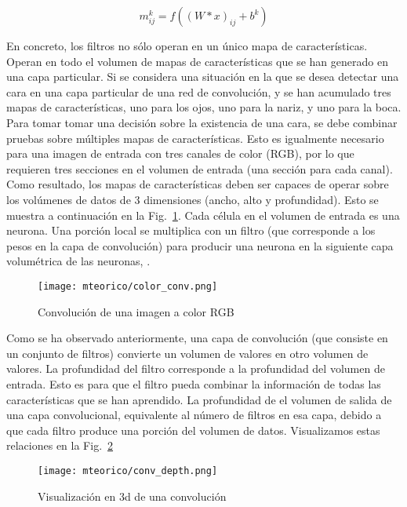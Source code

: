     \begin{equation}
		m^k_{ij}=f((W*x)_{ij}+b^k)
	\end{equation}
	
	En concreto, los filtros no sólo operan en un único mapa de características. Operan en todo el volumen de mapas de características que se han generado en una capa particular. Si se considera una situación en la que se desea detectar una cara en una capa particular de una red de convolución, y se han acumulado tres mapas de características, uno para los ojos, uno para la nariz, y uno para la boca. Para tomar tomar una decisión sobre la existencia de una cara, se debe combinar pruebas sobre múltiples mapas de características. Esto es igualmente necesario para una imagen de entrada con tres canales de color (RGB), por lo que requieren tres secciones en el volumen de entrada (una sección para cada canal). Como resultado, los mapas de características deben ser capaces de operar sobre los volúmenes de datos de 3 dimensiones (ancho, alto y profundidad). Esto se muestra a continuación en la Fig.~\ref{fig:color_conv}. Cada célula en el volumen de entrada es una neurona. Una porción local se multiplica con un filtro (que corresponde a los pesos en la capa de convolución) para producir una neurona en la siguiente capa volumétrica de las neuronas, \cite{dlBook}.
	\begin{figure}[htp]
        \centering
        \texttt{[image: mteorico/color\_conv.png]}
        \caption{Convolución de una imagen a color RGB}
        \label{fig:color_conv}
    \end{figure}

	Como se ha observado anteriormente, una capa de convolución (que consiste en un conjunto de filtros) convierte un volumen de valores en otro volumen de valores. La profundidad del filtro corresponde a la profundidad del volumen de entrada. Esto es para que el filtro pueda combinar la información de todas las características que se han aprendido. La profundidad de el volumen de salida de una capa convolucional, equivalente al número de filtros en esa capa, debido a que cada filtro produce una porción del volumen de datos. Visualizamos estas relaciones en la Fig.~\ref{fig:conv_depth}
	\begin{figure}[htp]
        \centering
        \texttt{[image: mteorico/conv\_depth.png]}
        \caption{Visualización en 3d de una convolución}
        \label{fig:conv_depth}
    \end{figure}


